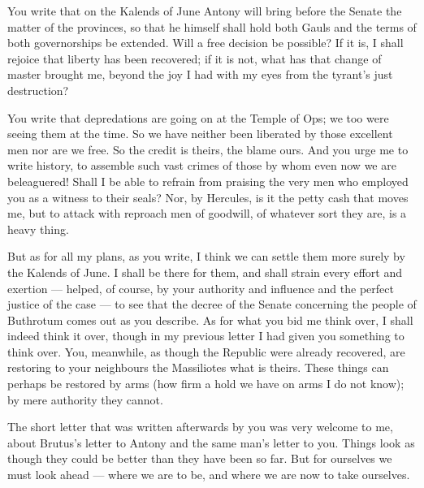  You write that on the Kalends of June Antony will bring before the Senate the matter of the provinces, so that he himself shall hold both Gauls and the terms of both governorships be extended. Will a free decision be possible? If it is, I shall rejoice that liberty has been recovered; if it is not, what has that change of master brought me, beyond the joy I had with my eyes from the tyrant's just destruction?

 You write that depredations are going on at the Temple of Ops; we too were seeing them at the time. So we have neither been liberated by those excellent men nor are we free. So the credit is theirs, the blame ours. And you urge me to write history, to assemble such vast crimes of those by whom even now we are beleaguered! Shall I be able to refrain from praising the very men who employed you as a witness to their seals? Nor, by Hercules, is it the petty cash that moves me, but to attack with reproach men of goodwill, of whatever sort they are, is a heavy thing.

 But as for all my plans, as you write, I think we can settle them more surely by the Kalends of June. I shall be there for them, and shall strain every effort and exertion --- helped, of course, by your authority and influence and the perfect justice of the case --- to see that the decree of the Senate concerning the people of Buthrotum comes out as you describe. As for what you bid me think over, I shall indeed think it over, though in my previous letter I had given you something to think over. You, meanwhile, as though the Republic were already recovered, are restoring to your neighbours the Massiliotes what is theirs. These things can perhaps be restored by arms (how firm a hold we have on arms I do not know); by mere authority they cannot.

 The short letter that was written afterwards by you was very welcome to me, about Brutus's letter to Antony and the same man's letter to you. Things look as though they could be better than they have been so far. But for ourselves we must look ahead --- where we are to be, and where we are now to take ourselves.
